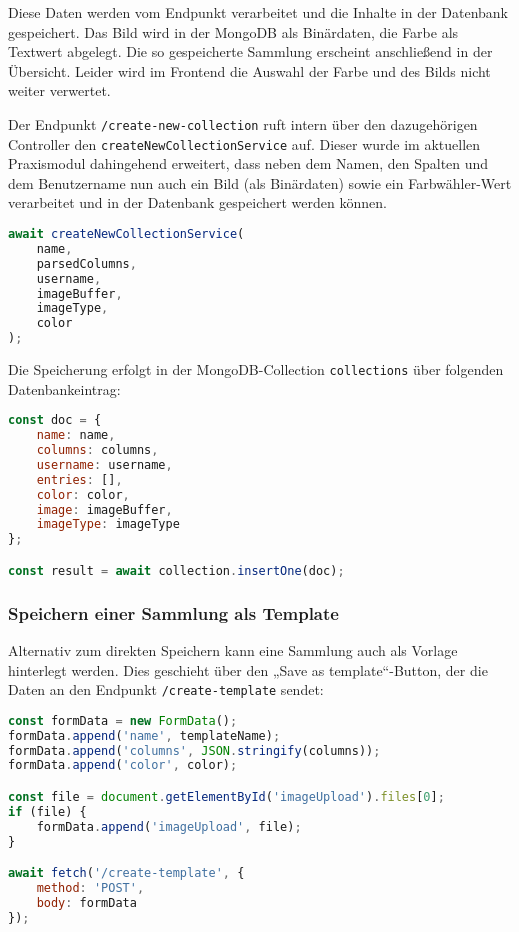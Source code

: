 Diese Daten werden vom Endpunkt  verarbeitet und die Inhalte in der Datenbank gespeichert.
Das Bild wird in der MongoDB als Binärdaten, die Farbe als Textwert abgelegt.
Die so gespeicherte Sammlung erscheint anschließend in der Übersicht.
Leider wird im Frontend die Auswahl der Farbe und des Bilds nicht weiter verwertet.

Der Endpunkt \texttt{/create-new-collection} ruft intern über den dazugehörigen Controller den \texttt{createNewCollectionService} auf.
Dieser wurde im aktuellen Praxismodul dahingehend erweitert, dass neben dem Namen, den Spalten und dem Benutzername nun auch ein Bild (als Binärdaten) sowie ein Farbwähler-Wert verarbeitet und in der Datenbank gespeichert werden können.

\begin{lstlisting}[language=JavaScript, caption=Service-Aufruf im Controller]
await createNewCollectionService(
    name,
    parsedColumns,
    username,
    imageBuffer,
    imageType,
    color
);
\end{lstlisting}

Die Speicherung erfolgt in der MongoDB-Collection \texttt{collections} über folgenden Datenbankeintrag:

\begin{lstlisting}[language=JavaScript, caption=Dokumentstruktur im Service]
const doc = {
    name: name,
    columns: columns,
    username: username,
    entries: [],
    color: color,
    image: imageBuffer,
    imageType: imageType
};

const result = await collection.insertOne(doc);
\end{lstlisting}

\subsubsection{Speichern einer Sammlung als Template}\label{subsubsec:save-as-template}

Alternativ zum direkten Speichern kann eine Sammlung auch als Vorlage hinterlegt werden.
Dies geschieht über den „Save as template“-Button, der die Daten an den Endpunkt \texttt{/create-template} sendet:

\begin{lstlisting}[language=JavaScript, caption=Clientseitiges Speichern einer Sammlung als Vorlage]
const formData = new FormData();
formData.append('name', templateName);
formData.append('columns', JSON.stringify(columns));
formData.append('color', color);

const file = document.getElementById('imageUpload').files[0];
if (file) {
    formData.append('imageUpload', file);
}

await fetch('/create-template', {
    method: 'POST',
    body: formData
});
\end{lstlisting}

